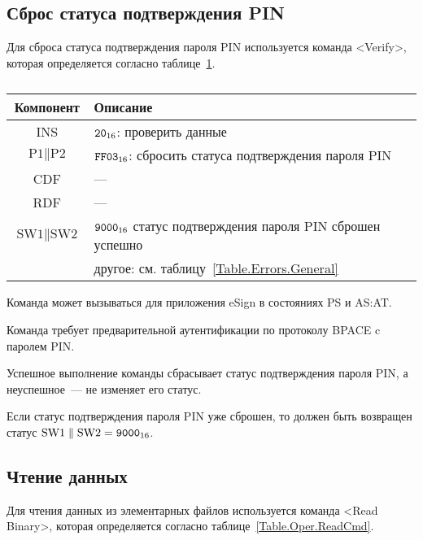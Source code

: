 \subsection{Сброс статуса подтверждения PIN}
\label{Oper.Descr.VerifyDeauth}

Для сброса статуса подтверждения пароля PIN
используется команда <Verify>,
которая определяется согласно 
таблице~\ref{Table.Oper.VerifyDeauthCmd}.

\begin{table}[hbt]
\caption{}\label{Table.Oper.VerifyDeauthCmd}
\begin{tabular}{|c|p{14cm}|}
\hline
Компонент & Описание \\
\hline
\hline
INS & $\texttt{20}_{16}$: проверить данные\\
\hline
$\text{P1} \parallel \text{P2}$ & $\texttt{FF03}_{16}$: сбросить статуса подтверждения
пароля PIN  \\
\hline
CDF & ---  \\
\hline 
RDF &  --- \\
\hline
$\text{SW1} \parallel \text{SW2}$ & $\texttt{9000}_{16}$ 
статус подтверждения пароля PIN сброшен успешно\\
& другое: см. таблицу~\ref{Table.Errors.General} \\
\hline
\end{tabular}
\end{table}

Команда может вызываться для приложения eSign  
в состояниях PS и AS:AT.

Команда требует предварительной аутентификации 
по протоколу BPACE c паролем PIN.

Успешное выполнение команды сбрасывает статус подтверждения пароля PIN,
а неуспешное~--- не изменяет его статус.

Если статус подтверждения пароля PIN уже сброшен, то должен быть возвращен статус
$\text{SW1} \parallel \text{SW2} = \texttt{9000}_{16}$.

\subsection{Чтение данных}
\label{Oper.Descr.Read}

Для чтения данных из элементарных файлов 
используется команда <Read Binary>, 
которая определяется согласно 
таблице~\ref{Table.Oper.ReadCmd}.

